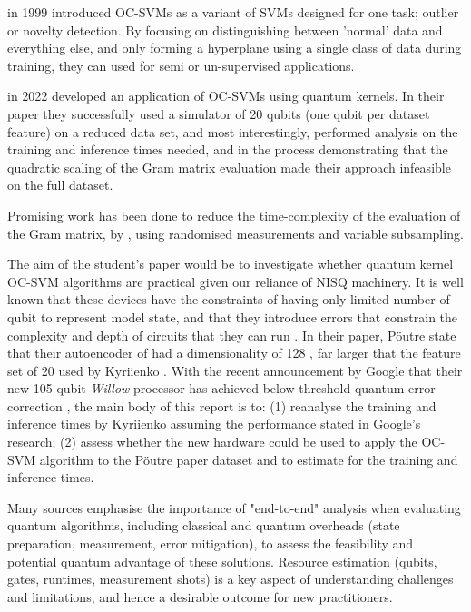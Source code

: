 \citeauthor{Scholkopf:1999} in 1999 \cite{Scholkopf:1999} introduced OC-SVMs as a variant of SVMs designed for one task;
outlier or novelty detection.
By focusing on distinguishing between 'normal' data and everything else, 
and only forming a hyperplane using a single class of data during training, 
they can used for semi or un-supervised applications.

\citeauthor{Kyriienko:2022} \cite{Kyriienko:2022} in 2022 developed an application of OC-SVMs using quantum kernels.
In their paper they successfully used a simulator of 20 qubits (one qubit per dataset feature)
on a reduced data set, and most interestingly, performed analysis on the training and inference times needed, 
and in the process demonstrating that the quadratic scaling of the Gram matrix evaluation 
made their approach infeasible on the full dataset.

Promising work has been done to reduce the time-complexity of the evaluation of the Gram matrix, 
by \citeauthor{Kolle:2023} \cite{Kolle:2023}, using randomised measurements and variable subsampling.

The aim of the student's paper would be to investigate whether quantum kernel OC-SVM algorithms are practical 
given our reliance of NISQ machinery.
It is well known that these devices have the constraints of having only limited number of qubit to represent model state,
and that they introduce errors that constrain the complexity and depth of circuits that they can run \cite{Preskill:2018}.
In their paper, P\"{o}utre state that their autoencoder of had a dimensionality of 128 \cite{Poutre:2024},
far larger that the feature set of 20 used by Kyriienko \cite{Kyriienko:2022}.
With the recent announcement by Google that their new 105 qubit \emph{Willow} processor has
achieved below threshold quantum error correction \cite{Google:Willow:2024}, the main body of this report is to: 
(1) reanalyse the training and inference times by Kyriienko assuming the performance stated in Google's research;
(2) assess whether the new hardware could be used to apply the OC-SVM algorithm to the P\"{o}utre paper dataset
and to estimate for the training and inference times.

Many sources emphasise the importance of "end-to-end" analysis when evaluating quantum \cite{Dalzell:2023} \cite{Morales:2025}
algorithms, including classical and quantum overheads (state preparation, measurement, error mitigation),
to assess the feasibility and potential quantum advantage of these solutions.  
Resource estimation (qubits, gates, runtimes, measurement shots) 
is a key aspect of understanding challenges and limitations,
and hence a desirable outcome for new practitioners.

